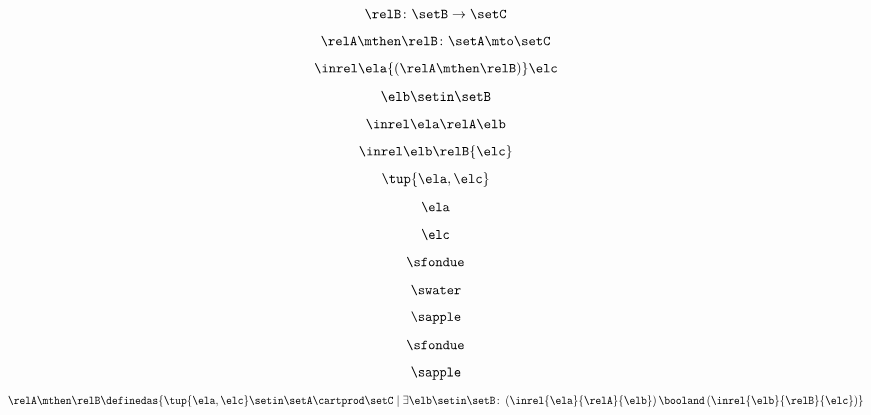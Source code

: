 \begin{forslides}
\begin{equation}\label{eq:slides_session2_rel_84}
\relB \colon \setB \to \setC
\end{equation}
 \begin{equation}\label{eq:slides_session2_rel_85}
\relA \mthen \relB \colon \setA \mto \setC
\end{equation}
\begin{equation}\label{eq:slides_session2_rel_86}
\inrel \ela {(\relA \mthen \relB)} \elc
\end{equation}
 \begin{equation}\label{eq:slides_session2_rel_87}
\elb \setin \setB
\end{equation}
\begin{equation}\label{eq:slides_session2_rel_88}
\inrel \ela \relA \elb 
\end{equation}
 \begin{equation}\label{eq:slides_session2_rel_89}
\inrel \elb \relB{\elc}
\end{equation}
\begin{equation}\label{eq:slides_session2_rel_90}
\tup{\ela,\elc}
\end{equation}
 \begin{equation}\label{eq:slides_session2_rel_91}
\ela
\end{equation}
\begin{equation}\label{eq:slides_session2_rel_92}
\elc
\end{equation}
 \begin{equation}\label{eq:slides_session2_rel_93}
\sfondue
\end{equation}
\begin{equation}\label{eq:slides_session2_rel_94}
\swater
\end{equation}
 \begin{equation}\label{eq:slides_session2_95}
\sapple
\end{equation}
\begin{equation}\label{eq:slides_session2_rel_96}
\sfondue
\end{equation}
 \begin{equation}\label{eq:slides_session2_rel_97}
\sapple
\end{equation}
\begin{equation}\label{eq:slides_session2_rel_98}
 \relA \mthen \relB \definedas \{\tup{\ela,\elc} \setin \setA \cartprod \setC \mid  \exists \elb \setin \setB \colon \left(\inrel{\ela}{\relA}{\elb} \right) \booland \left(\inrel{\elb}{\relB}{\elc}\right)\}
\end{equation}


\end{forslides}
